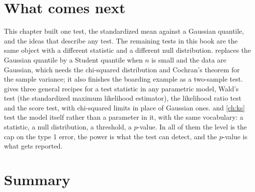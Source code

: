\section{What comes next}
\label{sec:tests-next}

This chapter built one test, the standardized mean against a Gaussian quantile, and the ideas that describe any test.
The remaining tests in this book are the same object with a different statistic and a different null distribution.
 replaces the Gaussian quantile by a Student quantile when $n$ is small and the data are Gaussian, which needs the chi-squared distribution and Cochran's theorem for the sample variance; it also finishes the boarding example as a two-sample test.
 gives three general recipes for a test statistic in any parametric model, Wald's test (the standardized maximum likelihood estimator), the likelihood ratio test and the score test, with chi-squared limits in place of Gaussian ones.
 and \cref{ch:ks} test the model itself rather than a parameter in it, with the same vocabulary: a statistic, a null distribution, a threshold, a $p$-value.
In all of them the level is the cap on the type 1 error, the power is what the test can detect, and the $p$-value is what gets reported.

\section{Summary}
\label{sec:tests-summary}

